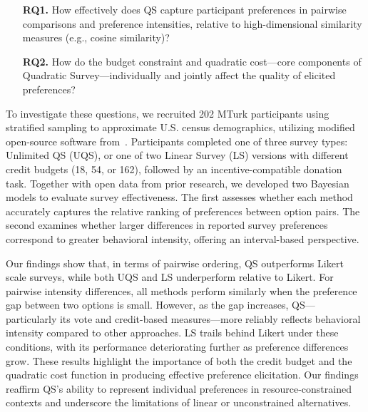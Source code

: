 \begin{itemize}
    \item [\textbf{RQ1.}] How effectively does QS capture participant preferences in pairwise comparisons and preference intensities, relative to high-dimensional similarity measures (e.g., cosine similarity)?
    \item [\textbf{RQ2.}] How do the budget constraint and quadratic cost---core components of Quadratic Survey---individually and jointly affect the quality of elicited preferences?
\end{itemize}


To investigate these questions, we recruited 202 MTurk participants using stratified sampling to approximate U.S. census demographics, utilizing modified open-source software from~\citet{chengCanShowWhat2021}. Participants completed one of three survey types: Unlimited QS (UQS), or one of two Linear Survey (LS) versions with different credit budgets (18, 54, or 162), followed by an incentive-compatible donation task. Together with open data from prior research, we developed two Bayesian models to evaluate survey effectiveness. The first assesses whether each method accurately captures the relative ranking of preferences between option pairs. The second examines whether larger differences in reported survey preferences correspond to greater behavioral intensity, offering an interval-based perspective.

Our findings show that, in terms of pairwise ordering, QS outperforms Likert scale surveys, while both UQS and LS underperform relative to Likert. For pairwise intensity differences, all methods perform similarly when the preference gap between two options is small. However, as the gap increases, QS—particularly its vote and credit-based measures—more reliably reflects behavioral intensity compared to other approaches. LS trails behind Likert under these conditions, with its performance deteriorating further as preference differences grow. These results highlight the importance of both the credit budget and the quadratic cost function in producing effective preference elicitation. Our findings reaffirm QS's ability to represent individual preferences in resource-constrained contexts and underscore the limitations of linear or unconstrained alternatives.



